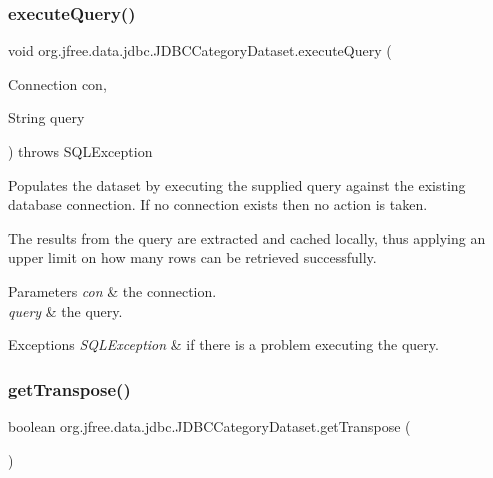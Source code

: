 \subsubsection{\texorpdfstring{execute\+Query()}{executeQuery()}\hspace{0.1cm}{\footnotesize\ttfamily [2/2]}}
{\footnotesize\ttfamily void org.\+jfree.\+data.\+jdbc.\+J\+D\+B\+C\+Category\+Dataset.\+execute\+Query (\begin{DoxyParamCaption}\item[{Connection}]{con,  }\item[{String}]{query }\end{DoxyParamCaption}) throws S\+Q\+L\+Exception}

Populates the dataset by executing the supplied query against the existing database connection. If no connection exists then no action is taken. 

The results from the query are extracted and cached locally, thus applying an upper limit on how many rows can be retrieved successfully.


\begin{DoxyParams}{Parameters}
{\em con} & the connection. \\
\hline
{\em query} & the query.\\
\hline
\end{DoxyParams}

\begin{DoxyExceptions}{Exceptions}
{\em S\+Q\+L\+Exception} & if there is a problem executing the query. \\
\hline
\end{DoxyExceptions}
\mbox{\label{classorg_1_1jfree_1_1data_1_1jdbc_1_1_j_d_b_c_category_dataset_af119519811886f662cb823bdf5c3a154}} 
\subsubsection{\texorpdfstring{get\+Transpose()}{getTranspose()}}
{\footnotesize\ttfamily boolean org.\+jfree.\+data.\+jdbc.\+J\+D\+B\+C\+Category\+Dataset.\+get\+Transpose (\begin{DoxyParamCaption}{ }\end{DoxyParamCaption})}

